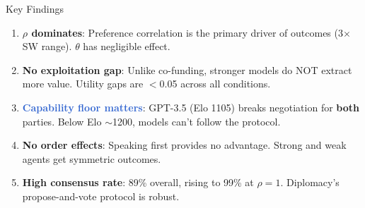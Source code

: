 \documentclass[aspectratio=169]{beamer}
\begin{document}
\begin{frame}{Key Findings}

\begin{enumerate}
    \item \textcolor{neutral}{\textbf{$\rho$ dominates}}: Preference correlation is the primary driver of outcomes (3$\times$ SW range). $\theta$ has negligible effect.

    \vspace{0.3cm}
    \item \textcolor{good}{\textbf{No exploitation gap}}: Unlike co-funding, stronger models do NOT extract more value. Utility gaps are $<$0.05 across all conditions.

    \vspace{0.3cm}
    \item \textcolor{highlight}{\textbf{Capability floor matters}}: GPT-3.5 (Elo 1105) breaks negotiation for \textbf{both} parties. Below Elo $\sim$1200, models can't follow the protocol.

    \vspace{0.3cm}
    \item \textbf{No order effects}: Speaking first provides no advantage. Strong and weak agents get symmetric outcomes.

    \vspace{0.3cm}
    \item \textbf{High consensus rate}: 89\% overall, rising to 99\% at $\rho{=}1$. Diplomacy's propose-and-vote protocol is robust.
\end{enumerate}
\end{frame}
\end{document}
